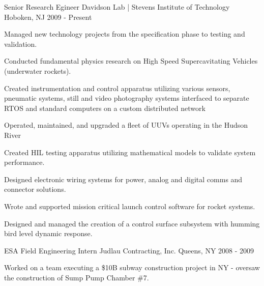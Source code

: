 

\begin{cventries}

  \cventry
    {Senior Research Egineer} %
    {Davidson Lab | Stevens Institute of Technology} %
    {Hoboken, NJ} %
    {2009 - Present} %
    {
      \begin{cvitems} %
        \item {Managed new technology projects from the specification phase to testing and validation.}
        \item {Conducted fundamental physics research on High Speed Supercavitating Vehicles (underwater rockets).}
        \item {Created instrumentation and control apparatus utilizing various sensors, pneumatic systems, still and video photography systems interfaced to separate RTOS and standard computers on a custom distributed network} 
        \item {Operated, maintained, and upgraded a fleet of UUVs operating in the Hudson River}
        \item {Created HIL testing apparatus utilizing mathematical models to validate system performance.}
        \item {Designed electronic wiring systems for power, analog and digital comms and connector solutions.}
        \item {Wrote and supported mission critical launch control software for rocket systems.}
        \item {Designed and managed the creation of a control surface subsystem with humming bird level dynamic response.}
      \end{cvitems}
    }

  \cventry
    {ESA Field Engineering Intern} %
    {Judlau Contracting, Inc.} %
    {Queens, NY} %
    {2008 - 2009} %
    {%
      \begin{cvitems} %
        \item {Worked on a team executing a \$10B subway construction project in
            NY - oversaw the construction of Sump Pump Chamber \#7.}
      \end{cvitems}
    }

\end{cventries}
